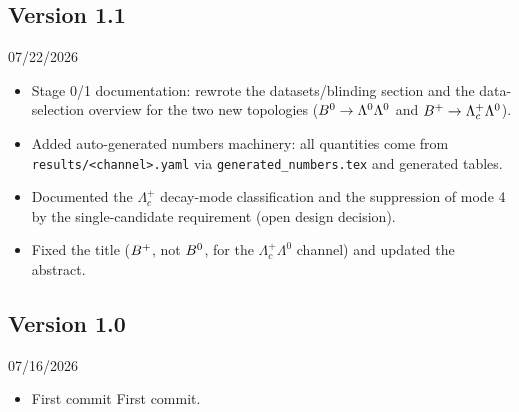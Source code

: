 
\subsection{Version 1.1}
07/22/2026
\begin{itemize}
    \item Stage 0/1 documentation: rewrote the datasets/blinding section
          and the data-selection overview for the two new topologies
          ($B^0 \rightarrow \Lambda^0\Lambda^0$ and
          $B^+ \rightarrow \Lambda_c^+\Lambda^0$).
    \item Added auto-generated numbers machinery: all quantities come
          from {\tt results/<channel>.yaml} via
          {\tt generated\_numbers.tex} and generated tables.
    \item Documented the $\Lambda_c^+$ decay-mode classification and the
          suppression of mode 4 by the single-candidate requirement
          (open design decision).
    \item Fixed the title ($B^+$, not $B^0$, for the
          $\Lambda_c^+\Lambda^0$ channel) and updated the abstract.
\end{itemize}

\subsection{Version 1.0}
07/16/2026
\begin{itemize}
    \item First commit
    First commit.
\end{itemize}
